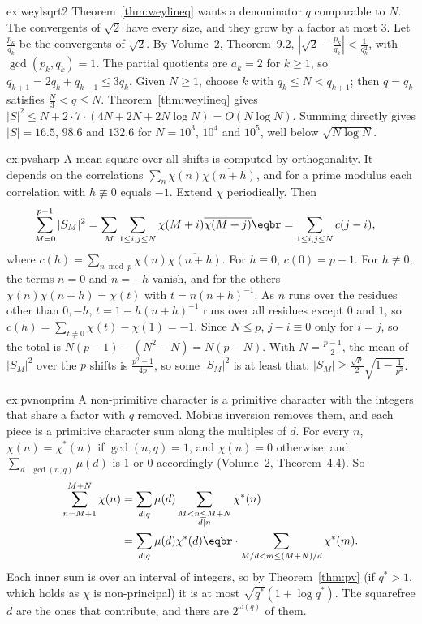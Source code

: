 \begin{solution}{ex:weylsqrt2}
\idea Theorem~\ref{thm:weylineq} wants a denominator $q$ comparable to $N$. The convergents of $\sqrt2$ have every size, and they grow by a factor at most $3$.
\writeup Let $\frac{p_k}{q_k}$ be the convergents of $\sqrt2$. By Volume~2, Theorem~9.2, $|\sqrt2-\frac{p_k}{q_k}|<\frac1{q_k^2}$, with $\gcd(p_k,q_k)=1$. The partial quotients are $a_k=2$ for $k\ge1$, so $q_{k+1}=2q_k+q_{k-1}\le3q_k$. Given $N\ge1$,
choose $k$ with $q_k\le N<q_{k+1}$; then $q=q_k$ satisfies $\frac N3<q\le N$. Theorem~\ref{thm:weylineq} gives $|S|^2\le N+2\cdot7\cdot(4N+2N+2N\log N)=O(N\log N)$. Summing directly gives $|S|=16.5$, $98.6$ and $132.6$ for $N=10^3$, $10^4$ and $10^5$, well below $\sqrt{N\log N}$.
\end{solution}

\begin{solution}{ex:pvsharp}
\idea A mean square over all shifts is computed by orthogonality. It depends on the correlations $\sum_n\chi(n)\overline{\chi(n+h)}$, and for a prime modulus each correlation with $h\not\equiv0$ equals $-1$.
\writeup Extend $\chi$ periodically. Then
\[
\begin{aligned}\sum_{M=0}^{p-1}|S_M|^2&=\sum_{M}\sum_{1\le i,j\le N}\chi(M+i)\overline{\chi(M+j)}\eqbr=\sum_{1\le i,j\le N}c(j-i),\end{aligned}
\]
where $c(h)=\sum_{n\bmod p}\chi(n)\overline{\chi(n+h)}$. For $h\equiv0$, $c(0)=p-1$. For $h\not\equiv0$, the terms $n=0$ and $n=-h$ vanish, and for the others $\chi(n)\overline{\chi(n+h)}=\chi(t)$ with $t=n(n+h)^{-1}$. As $n$ runs over
the residues other than $0,-h$, $t=1-h(n+h)^{-1}$ runs over all residues except $0$ and $1$, so $c(h)=\sum_{t\ne0}\chi(t)-\chi(1)=-1$. Since $N\le p$, $j-i\equiv0$ only for $i=j$, so the total is $N(p-1)-(N^2-N)=N(p-N)$.
With $N=\frac{p-1}2$, the mean of $|S_M|^2$ over the $p$ shifts is $\frac{p^2-1}{4p}$, so some $|S_M|^2$ is at least that: $|S_M|\ge\frac{\sqrt p}2\sqrt{1-\frac1{p^2}}$.
\end{solution}

\begin{solution}{ex:pvnonprim}
\idea A non-primitive character is a primitive character with the integers that share a factor with $q$ removed. Möbius inversion removes them, and each piece is a primitive character sum along the multiples of $d$.
\writeup For every $n$, $\chi(n)=\chi^*(n)$ if $\gcd(n,q)=1$, and $\chi(n)=0$ otherwise; and $\sum_{d\mid\gcd(n,q)}\mu(d)$ is $1$ or $0$ accordingly (Volume~2, Theorem~4.4). So
\[
\begin{aligned}\sum_{n=M+1}^{M+N}\chi(n)&=\sum_{d\mid q}\mu(d)\sum_{\substack{M<n\le M+N\\d\mid n}}\chi^*(n)\\&=\sum_{d\mid q}\mu(d)\chi^*(d)\eqbr\cdot\sum_{M/d<m\le(M+N)/d}\chi^*(m).\end{aligned}
\]
Each inner sum is over an interval of integers, so by Theorem~\ref{thm:pv} (if $q^*>1$, which holds as $\chi$ is non-principal) it is at most $\sqrt{q^*}(1+\log q^*)$. The squarefree $d$ are the ones that contribute, and there are $2^{\omega(q)}$ of them.
\end{solution}

